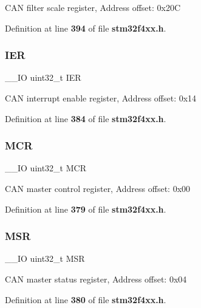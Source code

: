 C\+AN filter scale register, Address offset\+: 0x20C 

Definition at line \textbf{ 394} of file \textbf{ stm32f4xx.\+h}.

\mbox{\label{structCAN__TypeDef_a6566f8cfbd1d8aa7e8db046aa35e77db}} 
\subsubsection{I\+ER}
{\footnotesize\ttfamily \+\_\+\+\_\+\+IO uint32\+\_\+t I\+ER}

C\+AN interrupt enable register, Address offset\+: 0x14 

Definition at line \textbf{ 384} of file \textbf{ stm32f4xx.\+h}.

\mbox{\label{structCAN__TypeDef_a27af4e9f888f0b7b1e8da7e002d98798}} 
\subsubsection{M\+CR}
{\footnotesize\ttfamily \+\_\+\+\_\+\+IO uint32\+\_\+t M\+CR}

C\+AN master control register, Address offset\+: 0x00 

Definition at line \textbf{ 379} of file \textbf{ stm32f4xx.\+h}.

\mbox{\label{structCAN__TypeDef_acdd4c1b5466be103fb2bb2a225b1d3a9}} 
\subsubsection{M\+SR}
{\footnotesize\ttfamily \+\_\+\+\_\+\+IO uint32\+\_\+t M\+SR}

C\+AN master status register, Address offset\+: 0x04 

Definition at line \textbf{ 380} of file \textbf{ stm32f4xx.\+h}.

\mbox{\label{structCAN__TypeDef_a563d641ef16f769a56b9683fff35c517}} 
